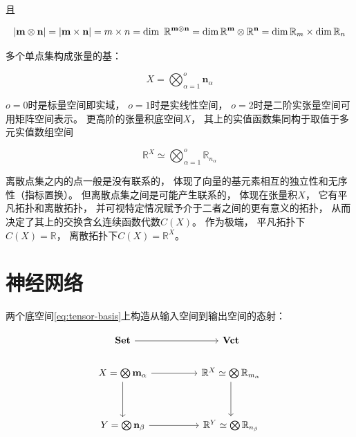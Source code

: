 \documentclass[10pt,a4paper]{article}
\begin{document}
且

$$
|\textbf m \otimes \textbf n| = |\textbf m \times \textbf n|
= m \times n 
= \dim \ \mathbb R^{\textbf{m} \otimes \textbf{n}}
= \dim \mathbb R^\textbf m \otimes \mathbb R^\textbf n 
= \dim \mathbb R_m \times \dim \mathbb R_n
$$

多个单点集构成张量的基：

\begin{equation}
X = \bigotimes_{\alpha=1}^o \textbf{n}_\alpha
\label{eq:tensor-basis}  
\end{equation}

$o=0$时是标量空间即实域，
$o=1$时是实线性空间，
$o=2$时是二阶实张量空间可用矩阵空间表示。
更高阶的张量积底空间$X$，
其上的实值函数集同构于取值于多元实值数组空间

$$
\mathbb R^X \simeq 
\bigotimes_{\alpha=1}^o \mathbb R_{n_\alpha}
$$

离散点集之内的点一般是没有联系的，
体现了向量的基元素相互的独立性和无序性（指标置换）。
但离散点集之间是可能产生联系的，
体现在张量积$X$，
它有平凡拓扑和离散拓扑，
并可视特定情况赋予介于二者之间的更有意义的拓扑，
从而决定了其上的交换含幺连续函数代数$C(X)$。
作为极端，
平凡拓扑下$C(X) = \mathbb R$，
离散拓扑下$C(X) = \mathbb R^X$。

\section{神经网络}

两个底空间\eqref{eq:tensor-basis}上构造从输入空间到输出空间的态射：

$$
\begin{tikzcd}
\textbf{Set} \arrow[rr]                                &  & \textbf{Vct}                                                  \\
X = \bigotimes \textbf{m}_\alpha \arrow[rr] \arrow[dd] &  & \mathbb R^X \simeq \bigotimes \mathbb R_{m_\alpha} \arrow[dd] \\
                                                       &  &                                                               \\
Y = \bigotimes \textbf{n}_\beta \arrow[rr]             &  & \mathbb R^Y \simeq \bigotimes \mathbb R_{n_\beta}            
\end{tikzcd}
$$
\end{document}
